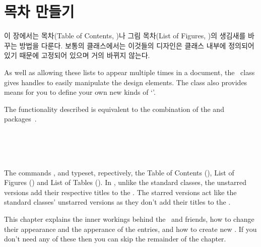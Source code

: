 \chapter{목차 만들기} \label{chap:toc}

이 장에서는 목차(Table of Contents, \toc)나 그림 목차(List of Figures, \lof)의
생김새를 바꾸는 방법을 다룬다.
보통의 클래스에서는 이것들의 디자인은 클래스 내부에 정의되어있기 때문에
고정되어 있으며 거의 바뀌지 않는다.

    As well as allowing these lists to appear multiple times in a
document, the \Mname\ class gives handles to easily manipulate the design 
elements. The class also provides means for you to define your own new kinds of
`\listofx'. 

    The functionality described is equivalent to the combination
of the  and  
packages~\cite{TOCLOFT,TOCBIBIND}.

\begin{syntax}
\cmd{\tableofcontents} \cmd{\tableofcontents*} \\
\cmd{\listoffigures} \cmd{\listoffigures*} \\
\cmd{\listoftables} \cmd{\listoftables*} \\
\end{syntax}
The commands \cmd{\tableofcontents}, \cmd{\listoffigures} and 
\cmd{\listoftables} typeset, repectively, the Table of Contents (\toc),
List of Figures (\lof) and List of Tables (\lot). In \Mname, unlike the 
standard classes, the unstarred versions add their respective titles to 
the \toc. The starred versions act like the standard classes' unstarred 
versions as they don't add their titles to the \toc.

    This chapter explains the inner workings behind the \toc\ and friends,
how to change their appearance and the apperance of the entries, and how to
create new \listofx. If you don't need any of these then you can
skip the remainder of the chapter.

